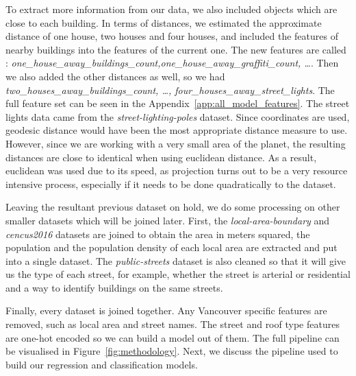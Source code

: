 To extract more information from our data, we also included objects which are close to each building. In terms of distances, we estimated the approximate distance of one house, two houses and four houses, and included the features of nearby buildings into the features of the current one. The new features are called : \textit{one\_house\_away\_buildings\_count,one\_house\_away\_graffiti\_count, \ldots}. Then we also added the other distances as well, so we had \textit{two\_houses\_away\_buildings\_count, \ldots, four\_houses\_away\_street\_lights}. The full feature set can be seen in the Appendix~\ref{app:all_model_features}. The street lights data came from the \textit{street-lighting-poles} dataset. Since coordinates are used, geodesic distance would have been the most appropriate distance measure to use. However, since we are working with a very small area of the planet, the resulting distances are close to identical when using euclidean distance. As a result, euclidean was used due to its speed, as projection turns out to be a very resource intensive process, especially if it needs to be done quadratically to the dataset.

Leaving the resultant previous dataset on hold, we do some processing on other smaller datasets which will be joined later. First, the \textit{local-area-boundary} and \textit{cencus2016} datasets are joined to obtain the area in meters squared, the population and the population density of each local area are extracted and put into a single dataset. The \textit{public-streets} dataset is also cleaned so that it will give us the type of each street, for example, whether the street is arterial or residential and a way to identify buildings on the same streets.

Finally, every dataset is joined together. Any Vancouver specific features are removed, such as local area and street names. The street and roof type features are one-hot encoded so we can build a model out of them. The full pipeline can be visualised in Figure~\ref{fig:methodology}. Next, we discuss the pipeline used to build our regression and classification models.

